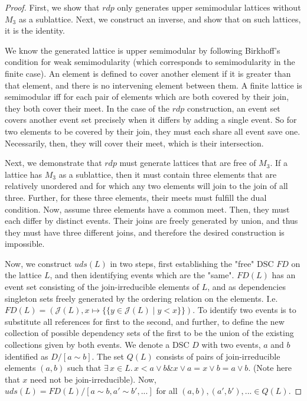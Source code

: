\documentclass[hoptionsi,review,format=acmsmall]{acmart}
\theoremstyle{definition}
\newcommand{\Jc}{\mathcal{J}}
\newcommand{\band}{\mathbin{\&}}
\begin{document}
\begin{proof}
First, we show that \(rdp\) only generates upper semimodular lattices without \(M_3\) as a sublattice. Next, we construct an inverse, and show that on such lattices, it is the identity.

We know the generated lattice is upper semimodular by following Birkhoff's condition for weak semimodularity (which corresponds to semimodularity in the finite case). An element is defined to cover another element if it is greater than that element, and there is no intervening element between them. A finite lattice is semimodular iff for each pair of elements which are both covered by their join, they both cover their meet. In the case of the \(rdp\) construction, an event set covers another event set precisely when it differs by adding a single event. So for two elements to be covered by their join, they must each share all event save one. Necessarily, then, they will cover their meet, which is their intersection.

Next, we demonstrate that \(rdp\) must generate lattices that are free of \(M_3\). If a lattice has \(M_3\) as a sublattice, then it must contain three elements that are relatively unordered and for which any two elements will join to the join of all three. Further, for these three elements, their meets must fulfill the dual condition. Now, assume three elements have a common meet. Then, they must each differ by distinct events.  Their joins are freely generated by union, and thus they must have three different joins, and therefore the desired construction is impossible.

Now, we construct \(uds(L)\) in two steps, first establishing the "free" DSC \(FD\) on the lattice \(L\), and then identifying events which are the "same". \(FD(L)\) has an event set consisting of the join-irreducible elements of \(L\), and as dependencies singleton sets freely generated by the ordering relation on the elements.  I.e. \(FD(L) = (\Jc(L), x \mapsto \{\{ y \in \Jc(L) \mid y<x\}\})\). To identify two events is to substitute all references for first to the second, and further, to define the new collection of possible dependency sets of the first to be the union of the existing collections given by both events. We denote a DSC \(D\) with two events, \(a\) and \(b\) identified as  \(D/[a\sim b]\). The set \(Q(L)\) consists of pairs of join-irreducible elements \((a,b)\) such that  \(\exists\, x \in L . \,  x < a \vee b \band x \vee a = x \vee b = a \vee b\). (Note here that \(x\) need not be join-irreducible). Now, \(uds(L) = FD(L)/[a \sim b,a' \sim b',...]\) for all \((a,b), (a',b'), ...\in Q(L)\).


\end{proof}
\end{document}
